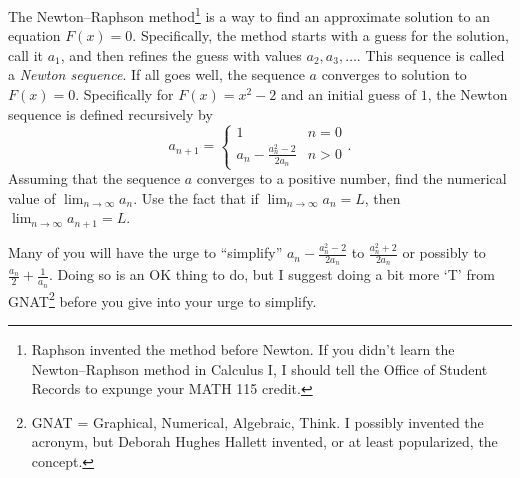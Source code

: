 \documentclass[12pt,fleqn]{exam}
\begin{document}
\begin{questions}
   \question [2] The Newton–Raphson method\footnote{Raphson invented
   the method before Newton. If you didn't learn the Newton–Raphson method
   in Calculus I, I should tell the Office of Student Records to 
   expunge your MATH 115 credit.} is a way to find an 
   approximate solution to an equation $F(x)=0$. Specifically,
   the method starts with a guess for the solution, call it $a_1$,
   and then refines the guess with values $a_2, a_3, \dots$. 
   This sequence is called a \emph{Newton sequence}.
   If all goes well, the sequence $a$ converges to 
   solution to $F(x)=0$. Specifically for $F(x) = x^2 - 2$ and
   an initial guess of $1$, the Newton sequence  is defined
   recursively by 
   \begin{equation*}
    a_{n+1} = \begin{cases} 1  & n=0  \\
                            a_n - \frac{a_n^2 - 2}{2 a_n} & n > 0
    \end{cases}.
\end{equation*}
Assuming that the sequence $a$ converges to a positive number, find the numerical
value of $\displaystyle \lim_{n \to \infty} a_n$.  Use the 
fact that if $\displaystyle \lim_{n \to \infty} a_n  = L$,
then $\displaystyle \lim_{n \to \infty} a_{n+1} = L$.

\quad Many of you will have the urge to ``simplify'' $a_n - \frac{a_n^2 - 2}{2 a_n}$
to $\frac{a_n^2 + 2}{2 a_n}$ or possibly to 
$\frac{a_n}{2} + \frac{1}{a_n}$. Doing so is an OK thing to do,
but I suggest doing a bit more `T' from GNAT\footnote{GNAT = Graphical,
Numerical, Algebraic, Think. I possibly invented the acronym, but 
Deborah Hughes Hallett invented, or at least popularized, the concept.} before you give into your urge to simplify.


\end{questions}
\end{document}

